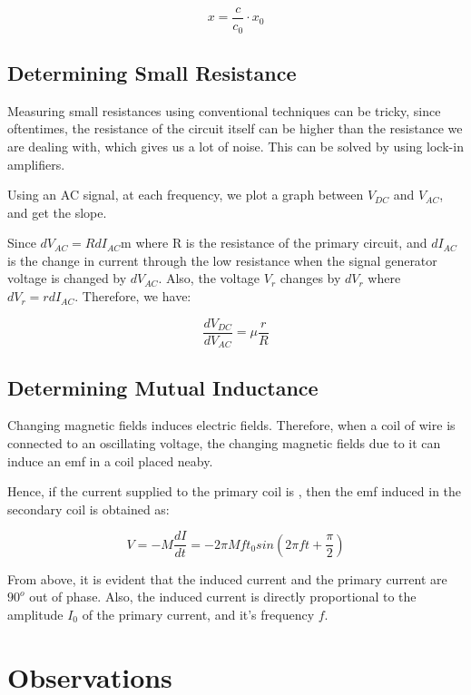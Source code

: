 \documentclass[a4paper]{article}
\begin{document}
\[
x = \frac{c}{c_0}\cdot x_0
\]

\hypertarget{determining-small-resistance}{%
\subsection{Determining Small
Resistance}\label{determining-small-resistance}}

Measuring small resistances using conventional techniques can be tricky,
since oftentimes, the resistance of the circuit itself can be higher
than the resistance we are dealing with, which gives us a lot of noise.
This can be solved by using lock-in amplifiers.

Using an AC signal, at each frequency, we plot a graph between
\(V_{DC}\) and \(V_{AC}\), and get the slope.

Since \(dV_{AC}=RdI_{AC}\)m where R is the resistance of the primary
circuit, and \(dI_{AC}\) is the change in current through the low
resistance when the signal generator voltage is changed by \(dV_{AC}\).
Also, the voltage \(V_r\) changes by \(dV_r\) where \(dV_r=rdI_{AC}\).
Therefore, we have:

\[
\frac{dV_{DC}}{dV_{AC}}=\mu \frac{r}{R}
\]

\hypertarget{determining-mutual-inductance}{%
\subsection{Determining Mutual
Inductance}\label{determining-mutual-inductance}}

Changing magnetic fields induces electric fields. Therefore, when a coil
of wire is connected to an oscillating voltage, the changing magnetic
fields due to it can induce an emf in a coil placed neaby.

Hence, if the current supplied to the primary coil is , then the emf
induced in the secondary coil is obtained as:

\[
V=-M\frac{dI}{dt}= -2\pi Mft_0 sin(2\pi f t+\frac{\pi}{2})
\]

From above, it is evident that the induced current and the primary
current are \(90^o\) out of phase. Also, the induced current is directly
proportional to the amplitude \(I_0\) of the primary current, and it's
frequency \(f\).

\hypertarget{observations}{%
\section{Observations}\label{observations}}
\end{document}

